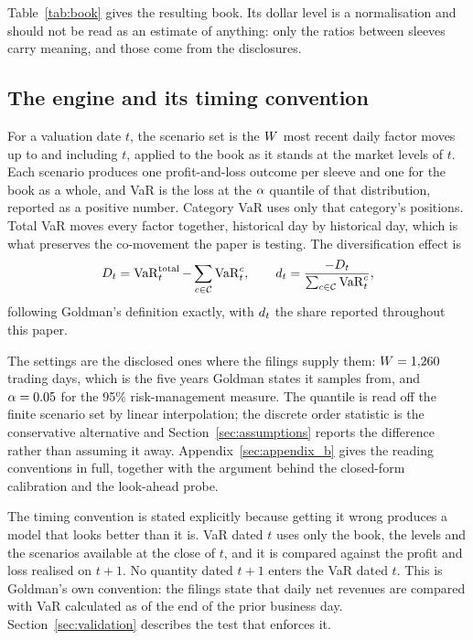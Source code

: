 Table~\ref{tab:book} gives the resulting book. Its dollar level is a
normalisation and should not be read as an estimate of anything: only the
ratios between sleeves carry meaning, and those come from the disclosures.



\subsection{The engine and its timing convention}

For a valuation date $t$, the scenario set is the $W$ most recent daily
factor moves up to and including $t$, applied to the book as it stands at the
market levels of $t$. Each scenario produces one profit-and-loss outcome per
sleeve and one for the book as a whole, and VaR is the loss at the
$\alpha$ quantile of that distribution, reported as a positive number. Category
VaR uses only that category's positions. Total VaR moves every factor together,
historical day by historical day, which is what preserves the co-movement the
paper is testing. The diversification effect is
\begin{equation}
D_{t} = \operatorname{VaR}_{t}^{\text{total}} - \sum_{c \in \mathcal{C}} \operatorname{VaR}_{t}^{c} ,
\qquad
d_{t} = \frac{-D_{t}}{\sum_{c \in \mathcal{C}} \operatorname{VaR}_{t}^{c}} ,
\label{eq:diversification}
\end{equation}
following Goldman's definition exactly, with $d_{t}$ the share reported
throughout this paper.

The settings are the disclosed ones where the filings supply them:
$W = 1{,}260$ trading days, which is the five years Goldman states it
samples from, and $\alpha = 0.05$ for the 95\% risk-management measure. The
quantile is read off the finite scenario set by linear interpolation; the
discrete order statistic is the conservative alternative and
Section~\ref{sec:assumptions} reports the difference rather than assuming it
away. Appendix~\ref{sec:appendix_b} gives the reading conventions in full,
together with the argument behind the closed-form calibration and the
look-ahead probe.

The timing convention is stated explicitly because getting it wrong produces a
model that looks better than it is. VaR dated $t$ uses only the book, the
levels and the scenarios available at the close of $t$, and it is compared
against the profit and loss realised on $t+1$. No quantity dated $t+1$ enters
the VaR dated $t$. This is Goldman's own convention: the filings state that
daily net revenues are compared with VaR calculated as of the end of the prior
business day. Section~\ref{sec:validation} describes the test that
enforces it.

